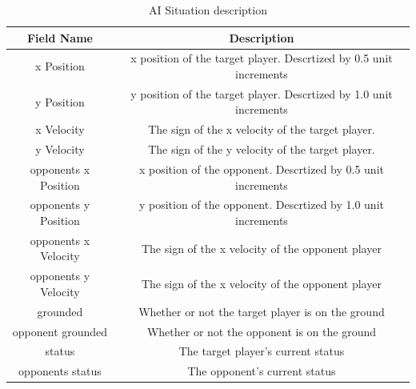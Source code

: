 \begin{table}[h]
	\centering
	\caption{AI Situation description}
	\begin{tabular}{| c | c |}
		\hline
		Field Name & Description \\
		\hline
		x Position        & x position of the target player. Descrtized by 0.5 unit increments	\\
		\hline
		y Position        & y position of the target player. Descrtized by 1.0 unit increments 	\\
		\hline
		x Velocity        & The sign of the x velocity of the target player.	\\
		\hline
		y Velocity        & The sign of the y velocity of the target player.	\\
		\hline
		opponents x Position        & x position of the opponent. Descrtized by 0.5 unit increments 	\\
		\hline
		opponents y Position        & y position of the opponent. Descrtized by 1.0 unit increments  	\\
		\hline
		opponents x Velocity        & The sign of the x velocity of the opponent player 	\\
		\hline
		opponents y Velocity        & The sign of the x velocity of the opponent player	\\
		\hline
		grounded        & Whether or not the target player is on the ground 	\\
		\hline
		opponent grounded       & Whether or not the opponent is on the ground  	\\
		\hline
		status        & The target player's current status 	\\
		\hline
		opponents status        & The opponent's current status 	\\
		\hline
	\end{tabular}
	\label{gamestate}
\end{table}


